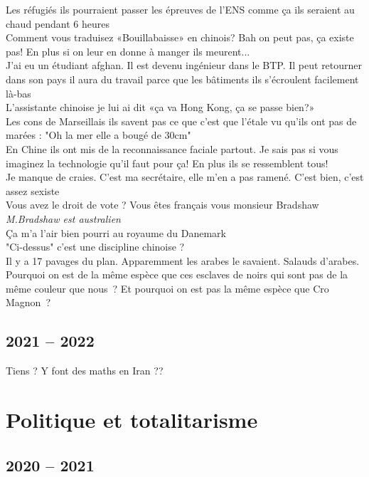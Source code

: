 \documentclass[french, a4paper, openany]{book}
\begin{document}
	\noindent \og Les réfugiés ils pourraient passer les épreuves de l'ENS comme ça ils seraient au chaud pendant 6 heures \fg \\
	\og Comment vous traduisez «Bouillabaisse» en chinois? Bah on peut pas, ça existe pas! En plus si on leur en donne à manger ils meurent... \fg \\
	\og J'ai eu un étudiant afghan. Il est devenu ingénieur dans le BTP. Il peut retourner dans son pays il aura du travail parce que les bâtiments ils s'écroulent facilement là-bas \fg \\
	\og L'assistante chinoise je lui ai dit «ça va Hong Kong, ça se passe bien?» \fg \\
	\og Les cons de Marseillais ils savent pas ce que c'est que l'étale vu qu'ils ont pas de marées : "Oh la mer elle a bougé de 30cm" \fg \\
	\og En Chine ils ont mis de la reconnaissance faciale partout. Je sais pas si vous imaginez la technologie qu'il faut pour ça! En plus ils se ressemblent tous! \fg \\
	\og Je manque de craies. C'est ma secrétaire, elle m'en a pas ramené. C'est bien, c'est assez sexiste \fg \\
	\og Vous avez le droit de vote ? Vous êtes français vous monsieur Bradshaw \fg \emph{M.Bradshaw est australien} \\
	\og Ça m'a l'air bien pourri au royaume du Danemark \fg \\
	\og "Ci-dessus" c'est une discipline chinoise ? \fg \\
	\og Il y a 17 pavages du plan. Apparemment les arabes le savaient. Salauds d'arabes. \fg \\
	\og Pourquoi on est de la même espèce que ces esclaves de noirs qui sont pas de la même couleur que nous~? Et pourquoi on est pas la même espèce que Cro Magnon~? \fg \\

\section{2021 -- 2022}
	
	\og Tiens ? Y font des maths en Iran ?? \fg \\

\chapter{Politique et totalitarisme}

\section{2020 -- 2021}
\end{document}
